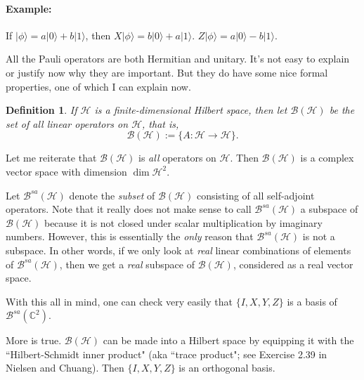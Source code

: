 \documentclass{article}
\newtheorem*{dfn}{Definition}
\newcommand{\ket}[1]{|#1\rangle}
\newcommand{\bbC}{\mathbb{C}}
\newcommand{\calH}{\mathcal{H}}
\begin{document}
\paragraph*{Example:} If $\ket{\phi} = a\ket{0} + b\ket{1}$, then $X\ket{\phi} = b\ket{0} + a\ket{1}$.  $Z\ket{\phi} = a\ket{0} - b\ket{1}$.

All the Pauli operators are both Hermitian and unitary.  It's not easy to explain or justify now why they are important.  But they do have some nice formal properties, one of which I can explain now.

\begin{dfn}
If $\mathcal{H}$ is a finite-dimensional Hilbert space, then let $\mathcal{B}(\mathcal{H})$ be the set of all linear operators on $\mathcal{H}$, that is,
\[ \mathcal{B}(\calH) := \{ A: \calH \to \calH\}.\]
\end{dfn}

Let me reiterate that $\mathcal{B}(\calH)$ is \emph{all} operators on $\calH$.  Then $\mathcal{B}(\mathcal{H})$ is a complex vector space with dimension $\dim\mathcal{H}^2$.

Let $\mathcal{B}^{sa}(\calH)$ denote the \emph{subset} of $\mathcal{B}(\calH)$ consisting of all self-adjoint operators.  Note that it really does not make sense to call $\mathcal{B}^{sa}(\calH)$ a subspace of $\mathcal{B}(\calH)$ because it is not closed under scalar multiplication by imaginary numbers.  However, this is essentially the \emph{only} reason that $\mathcal{B}^{sa}(\calH)$ is not a subspace.  In other words, if we only look at \emph{real} linear combinations of elements of $\mathcal{B}^{sa}(\calH)$, then we get a \emph{real} subspace of $\mathcal{B}(\mathcal{H})$, considered as a real vector space.

With this all in mind, one can check very easily that $\{I,X,Y,Z\}$ is a basis of $\mathcal{B}^{sa}(\bbC^2)$.

More is true.  $\mathcal{B}(\calH)$ can be made into a Hilbert space by equipping it with the ``Hilbert-Schmidt inner product" (aka ``trace product"; see Exercise 2.39 in Nielsen and Chuang).  Then $\{I,X,Y,Z\}$ is an orthogonal basis.
\end{document}
